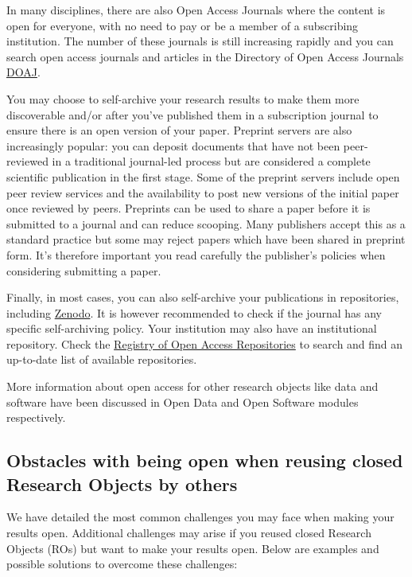 \documentclass[
  letterpaper,
  DIV=11,
  numbers=noendperiod]{scrreport}
\begin{document}
In many disciplines, there are also Open Access Journals where the
content is open for everyone, with no need to pay or be a member of a
subscribing institution. The number of these journals is still
increasing rapidly and you can search open access journals and articles
in the Directory of Open Access Journals
\href{https://www.doaj.org/}{DOAJ}.

You may choose to self-archive your research results to make them more
discoverable and/or after you've published them in a subscription
journal to ensure there is an open version of your paper. Preprint
servers are also increasingly popular: you can deposit documents that
have not been peer-reviewed in a traditional journal-led process but are
considered a complete scientific publication in the first stage. Some of
the preprint servers include open peer review services and the
availability to post new versions of the initial paper once reviewed by
peers. Preprints can be used to share a paper before it is submitted to
a journal and can reduce scooping. Many publishers accept this as a
standard practice but some may reject papers which have been shared in
preprint form. It's therefore important you read carefully the
publisher's policies when considering submitting a paper.

Finally, in most cases, you can also self-archive your publications in
repositories, including \href{https://zenodo.org/}{Zenodo}. It is
however recommended to check if the journal has any specific
self-archiving policy. Your institution may also have an institutional
repository. Check the \href{http://roar.eprints.org/}{Registry of Open
Access Repositories} to search and find an up-to-date list of available
repositories.

More information about open access for other research objects like data
and software have been discussed in Open Data and Open Software modules
respectively.

\hypertarget{obstacles-with-being-open-when-reusing-closed-research-objects-by-others}{%
\subsection{Obstacles with being open when reusing closed Research
Objects by
others}\label{obstacles-with-being-open-when-reusing-closed-research-objects-by-others}}

We have detailed the most common challenges you may face when making
your results open. Additional challenges may arise if you reused closed
Research Objects (ROs) but want to make your results open. Below are
examples and possible solutions to overcome these challenges:
\end{document}
